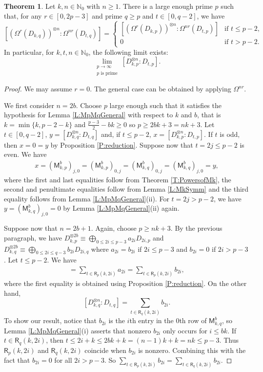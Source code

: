 \documentclass[12pt,reqno]{amsart}
\newcommand{\NN}{\mathbb{N}}
\newcommand{\Rect}{\mathsf{R}}
\renewcommand{\geq}{\geqslant}
\renewcommand{\leq}{\leqslant}
\newcommand{\M}{\mathsf{M}}
\theoremstyle{definition}
\newtheorem{thm}{Theorem}[section]
\numberwithin{equation}{section}
\begin{document}
\begin{thm}\label{T:pToinfinity}
  Let $k,n\in\NN_0$ with $n\geq 1$. There is a large enough prime $p$ such that, for any $r \in [0,2p-3]$ and prime $q\geq p$ and $t\in[0,q-2]$, we have \[[(\Omega^r(D_{k,q}))^{\otimes n}:\Omega^{nr}(D_{t,q})]=\left \{\begin{array}{ll} [(\Omega^r(D_{k,p}))^{\otimes n}:\Omega^{nr}(D_{t,p})]& \text{if $t\leq p-2$,}\\ 0&\text{if $t>p-2$.}\end{array}\right .\] In particular, for $k,t,n\in\NN_0$, the following limit exists:
  \[\lim_{\substack{p \to \infty \\ \text{$p$ is prime}}} [D_{k,p}^{\otimes n} : D_{t,p}].\]
\end{thm}
\begin{proof}
	We may assume $r=0$. The general case can be obtained by applying $\Omega^{nr}$. 
	
	
  We first consider $n=2b$. Choose $p$ large enough such that it satisfies the hypothesis for Lemma \ref{L:MpMqGeneral} with respect to $k$ and $b$, that is $k=\min\{k,p-2-k\}$ and $\frac{p-3}{2}-bk\geq 0$ so $p \geq 2bk+3 = nk + 3$. Let $t\in[0,q-2]$, $y=[D_{k,q}^{\otimes n}:D_{t,q}]$ and, if $t\leq p-2$, $x=[D_{k,p}^{\otimes n}:D_{t,p}]$. If $t$ is odd, then $x=0=y$ by Proposition \ref{P:reduction}. Suppose now that $t=2j\leq p-2$ is even. We have 
  \begin{align*}
    x=(\M_{k,p}^b)_{j,0}=(\M_{k,p}^b)_{0,j}= (\M_{k,q}^b)_{0,j}=(\M_{k,q}^b)_{j,0}=y,
  \end{align*} where the first and last equalities follow from Theorem \ref{T:PowersofMk}, the second and penultimate equalities follow from Lemma \ref{L:MkSymm} and the third equality follows from Lemma \ref{L:MpMqGeneral}(ii). For $t=2j>p-2$, we have $y=(\M_{k,q}^b)_{j,0}=0$ by Lemma \ref{L:MpMqGeneral}(ii) again. 
  
  Suppose now that $n=2b+1$. Again, choose $p \geq nk +3$. By the previous paragraph, we have  $D_{k,p}^{\otimes 2b}\equiv\bigoplus_{0\leq 2i\leq p-3}a_{2i}D_{2i,p}$ and $D_{k,q}^{\otimes 2b}\equiv\bigoplus_{0\leq 2i\leq q-3}b_{2i}D_{2i,q}$ where $a_{2i}=b_{2i}$ if $2i\leq p-3$ and $b_{2i}=0$ if $2i>p-3$. Let $t\leq p-2$. We have  
  \begin{align*}
    [D_{k,p}^{\otimes n}:D_{t,p}]=\sum_{t\in\Rect_p(k,2i)}a_{2i}= \sum_{t\in\Rect_p(k,2i)}b_{2i},
  \end{align*} where the first equality is obtained using Proposition \ref{P:reduction}. On the other hand, \[[D_{k,q}^{\otimes n}:D_{t,q}]=\sum_{t\in\Rect_q(k,2i)}b_{2i}.\] To show our result, notice that $b_{2i}$ is the $i$th entry in the $0$th row of $\M_{k,q}^b$, so Lemma \ref{L:MpMqGeneral}(i) asserts that nonzero $b_{2i}$ only occurs for $i\leq bk$. If $t \in \Rect_q(k,2i)$, then $t \leq 2i + k \leq 2bk + k = (n-1)k + k = nk \leq p-3$. Thus $\Rect_p(k,2i)$ and $\Rect_q(k,2i)$ coincide when $b_{2i}$ is nonzero. Combining this with the fact that $b_{2i} = 0$ for all $2i > p-3$. So $\sum_{t\in\Rect_p(k,2i)}b_{2i}= \sum_{t\in\Rect_q(k,2i)}b_{2i}$.
  

\end{proof}
\end{document}
